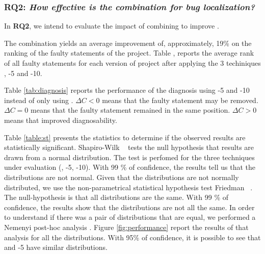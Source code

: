 \documentclass{article}
\begin{document}

\subsubsection{RQ2: \textit{How effective is the \comb{} combination for bug localization?}}


In \textbf{RQ2}, we intend to evaluate the impact of combining \ds{} to improve \ds{}.

The \comb{} combination yields an average improvement of, approximately, 19\% on the ranking of the faulty statements of the \chart{}
project. Table , reports the average rank of all faulty statements for each version of \chart{} project after
applying the 3 techiniques \sfl{}, \comb{}-5 and \comb{}-10.

Table \ref{tab:diagnosis} reports the performance of the diagnosis using \comb{}-5 and \comb{}-10 instead of only using \sfl{}. $\Delta C <0$ means that the faulty statement may be removed. $\Delta C=0$ means that the faulty statement remained in the same position. $\Delta C >0$ means that \ds{} improved diagnosability. 


Table \ref{table:st} presents the statistics to determine if the observed results are statistically significant. Shapiro-Wilk ~\cite{10.2307/2333709} tests the null hypothesis that results are drawn from a normal distribution. The test is perfomed for the three techniques under evaluation (\sfl{}, \comb{}-5, \comb{}-10). With 99 \% of confidence, the results tell us that the distributions are not normal. Given that the distributions are not normally distributed, we use the non-parametrical statistical hypothesis test Friedman ~\cite{10.2307/2279372}. The null-hypothesis is that all distributions are the same. With 99 \% of confidence, the results show that the distributions are not all the same. In order to understand if there was a pair of distributions that are equal, we performed a Nemenyi post-hoc analysis . Figure \ref{fig:performance} report the results of that analysis for all the distributions. With 95\% of confidence, it is possible to see that \sfl{} and \comb{}-5 have similar distributions.
\end{document}
